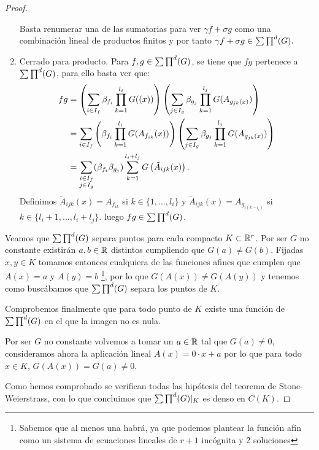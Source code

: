 \begin{proof}
\begin{enumerate}
        Basta renumerar una de las sumatorias para ver $\gamma f+ \sigma g$ como una combinación 
        lineal de productos finitos y por tanto $\gamma f+ \sigma g \in \sum \prod^d (G).$
        
      
        \item Cerrado para producto. Para $f,g \in \sum \prod^d (G)$, se tiene que $fg$ pertenece a $\sum \prod^d (G)$, para ello basta ver que: 
        \begin{align}
           f g & = 
           \left(
               \sum_{i \in I_f} \beta_{f_i} \prod_{k=1}^{l_i} G((x)) 
           \right) 
           \left(
               \sum_{j \in I_g} \beta_{g_j} \prod_{k=1}^{l_j} G(A_{g_{j k}(x)}) 
           \right) 
           \\
           & = 
            \sum_{i \in I_f} 
            \left(
                \beta_{f_i} \prod_{k=1}^{l_i} G(A_{f_{i k}}(x)) 
           \right) 
           \left(
               \sum_{j \in I_g} \beta_{g_j} \prod_{k=1}^{l_j} G(A_{g_{j k}(x)}) 
           \right) 
           \\
           & = 
           \sum_{
               \begin{subarray}{c}
                i \in I_f \\
                j \in I_g
               \end{subarray}
               }
               (\beta_{f_i} \beta_{g_j})
               \sum_{k = 1}^{l_i + l_j}G 
               \left(
                    \tilde{A}_{i j k}(x)
               \right).
        \end{align}
        Definimos $\tilde{A}_{i j k}(x) = A_{f_{i k}}$ si $k \in \{1, \ldots, l_i\}$
        y $\tilde{A}_{i j k}(x) = A_{g_{i (k - l_i)}}$ si $k \in \{l_i + 1, \ldots, l_i+l_j\}$.
        luego $fg \in \sum \prod^d (G)$. 
    \end{enumerate}

    Veamos que $\sum \prod^d (G)$ separa puntos para cada compacto $K \subset \mathbb{R}^r$. 
    Por ser $G$ no constante existirán $a,b \in \mathbb{R}$ distintos cumpliendo que $G(a) \neq G(b)$. Fijadas $x,y \in K$ tomamos entonces cualquiera de las 
    funciones afines que cumplen que $A(x) = a$ y $A(y)=b$ 
    \footnote{Sabemos que al menos una habrá, ya que podemos plantear la función afín
    como un sistema de ecuaciones lineales de $r+1$ incógnita y 2 soluciones}, 
    por lo que $G(A(x)) \neq G(A(y))$ y tenemos como buscábamos que $\sum \prod^d (G)$ separa los puntos de $K$. 

    Comprobemos finalmente que para todo punto de $K$ existe una función de $\sum \prod^d (G)$  en el que la imagen no es nula.  

    Por ser $G$ no constante volvemos a tomar un $a \in \mathbb{R}$ tal que $G(a) \neq 0$, consideramos ahora la aplicación lineal
    $A(x) = 0 \cdot x + a$ por lo que para todo $x \in K$, $G(A(x)) = G(a) \neq 0$. 

    Como hemos comprobado se verifican todas las hipótesis del teorema de Stone-Weierstrass, con lo que concluimos que $\sum \prod^d (G) |_K$ es denso en $C(K)$. 
\end{proof}

